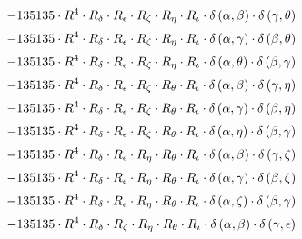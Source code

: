 \begin{subequations}
\begin{gather}
 \\[0.2em] \notag 		 - 135135 \cdot R^{4} \cdot R_{\delta{}} \cdot R_{\epsilon{}} \cdot R_{\zeta{}} \cdot R_{\eta{}} \cdot R_{\iota{}} \cdot \delta{}\left(\alpha{}, \beta{}\right) \cdot \delta{}\left(\gamma{}, \theta{}\right) 
 \\[0.2em] \notag 		 - 135135 \cdot R^{4} \cdot R_{\delta{}} \cdot R_{\epsilon{}} \cdot R_{\zeta{}} \cdot R_{\eta{}} \cdot R_{\iota{}} \cdot \delta{}\left(\alpha{}, \gamma{}\right) \cdot \delta{}\left(\beta{}, \theta{}\right) 
 \\[0.2em] \notag 		 - 135135 \cdot R^{4} \cdot R_{\delta{}} \cdot R_{\epsilon{}} \cdot R_{\zeta{}} \cdot R_{\eta{}} \cdot R_{\iota{}} \cdot \delta{}\left(\alpha{}, \theta{}\right) \cdot \delta{}\left(\beta{}, \gamma{}\right) 
 \\[0.2em] \notag 		 - 135135 \cdot R^{4} \cdot R_{\delta{}} \cdot R_{\epsilon{}} \cdot R_{\zeta{}} \cdot R_{\theta{}} \cdot R_{\iota{}} \cdot \delta{}\left(\alpha{}, \beta{}\right) \cdot \delta{}\left(\gamma{}, \eta{}\right) 
 \\[0.2em] \notag 		 - 135135 \cdot R^{4} \cdot R_{\delta{}} \cdot R_{\epsilon{}} \cdot R_{\zeta{}} \cdot R_{\theta{}} \cdot R_{\iota{}} \cdot \delta{}\left(\alpha{}, \gamma{}\right) \cdot \delta{}\left(\beta{}, \eta{}\right) 
 \\[0.2em] \notag 		 - 135135 \cdot R^{4} \cdot R_{\delta{}} \cdot R_{\epsilon{}} \cdot R_{\zeta{}} \cdot R_{\theta{}} \cdot R_{\iota{}} \cdot \delta{}\left(\alpha{}, \eta{}\right) \cdot \delta{}\left(\beta{}, \gamma{}\right) 
 \\[0.2em] \notag 		 - 135135 \cdot R^{4} \cdot R_{\delta{}} \cdot R_{\epsilon{}} \cdot R_{\eta{}} \cdot R_{\theta{}} \cdot R_{\iota{}} \cdot \delta{}\left(\alpha{}, \beta{}\right) \cdot \delta{}\left(\gamma{}, \zeta{}\right) 
 \\[0.2em] \notag 		 - 135135 \cdot R^{4} \cdot R_{\delta{}} \cdot R_{\epsilon{}} \cdot R_{\eta{}} \cdot R_{\theta{}} \cdot R_{\iota{}} \cdot \delta{}\left(\alpha{}, \gamma{}\right) \cdot \delta{}\left(\beta{}, \zeta{}\right) 
 \\[0.2em] \notag 		 - 135135 \cdot R^{4} \cdot R_{\delta{}} \cdot R_{\epsilon{}} \cdot R_{\eta{}} \cdot R_{\theta{}} \cdot R_{\iota{}} \cdot \delta{}\left(\alpha{}, \zeta{}\right) \cdot \delta{}\left(\beta{}, \gamma{}\right) 
 \\[0.2em] \notag 		 - 135135 \cdot R^{4} \cdot R_{\delta{}} \cdot R_{\zeta{}} \cdot R_{\eta{}} \cdot R_{\theta{}} \cdot R_{\iota{}} \cdot \delta{}\left(\alpha{}, \beta{}\right) \cdot \delta{}\left(\gamma{}, \epsilon{}\right) 

\end{gather}
\end{subequations}
